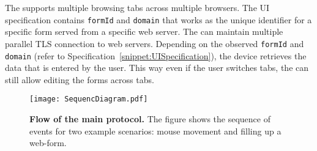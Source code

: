 The \device supports multiple browsing tabs across multiple browsers. The UI specification contains \texttt{formId} and \texttt{domain} that works as the unique identifier for a specific form served from a specific web server. The \device can maintain multiple parallel TLS connection to web servers. Depending on the observed \texttt{formId} and \texttt{domain} (refer to Specification~\ref{snippet:UISpecification}), the device retrieves the data that is entered by the user. This way even if the user switches tabs, the \device can still allow editing the forms across tabs.




\begin{figure}[t]
\centering
\texttt{[image: SequencDiagram.pdf]}
\caption{\textbf{Flow of the \name main protocol.} The figure shows the
sequence of events for two example scenarios: mouse movement and filling up a
web-form.}
\spacesave
\label{fig:sequence}
\centering
\end{figure}

